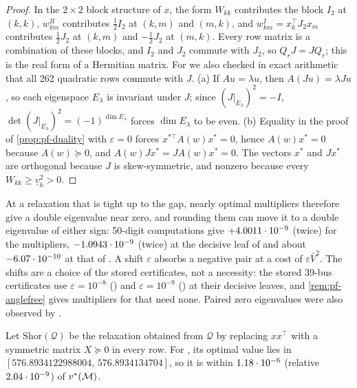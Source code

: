 \begin{proof}
In the $2\times2$ block structure of $x$, the form $W_{kk}$ contributes the block $I_2$ at $(k,k)$, $w^R_{km}$ contributes $\tfrac12I_2$ at $(k,m)$ and $(m,k)$, and $w^I_{km}=x_k^\top J_2x_m$ contributes $\tfrac12J_2$ at $(k,m)$ and $-\tfrac12J_2$ at $(m,k)$.
Every row matrix is a combination of these blocks, and $I_2$ and $J_2$ commute with $J_2$, so $Q_rJ=JQ_r$; this is the real form of a Hermitian matrix.
For  we also checked in exact arithmetic that all 262 quadratic rows commute with $J$.
(a) If $A u=\lambda u$, then $A(Ju)=\lambda Ju$, so each eigenspace $E_\lambda$ is invariant under $J$; since $(J|_{E_\lambda})^2=-I$, $\det(J|_{E_\lambda})^2=(-1)^{\dim E_\lambda}$ forces $\dim E_\lambda$ to be even.
(b) Equality in the proof of \cref{prop:pf-duality} with $\varepsilon=0$ forces $x^{*\top}A(w)x^*=0$, hence $A(w)x^*=0$ because $A(w)\succeq0$, and $A(w)Jx^*=JA(w)x^*=0$.
The vectors $x^*$ and $Jx^*$ are orthogonal because $J$ is skew-symmetric, and nonzero because every $W_{kk}\ge\underline v_k^2>0$.
\end{proof}

At a relaxation that is tight up to the gap, nearly optimal multipliers therefore give a double eigenvalue near zero, and rounding them can move it to a double eigenvalue of either sign:
50-digit computations give $+4.0011\cdot 10^{-9}$ (twice) for the  multipliers, $-1.0943\cdot 10^{-9}$ (twice) at the decisive leaf of  and about $-6.07\cdot 10^{-10}$ at that of .
A shift $\varepsilon$ absorbs a negative pair at a cost of $\varepsilon\bar V^2$.
The shifts are a choice of the stored certificates, not a necessity: the stored 39-bus certificates use $\varepsilon=10^{-8}$ () and $\varepsilon=10^{-9}$ () at their decisive leaves, and \cref{rem:pf-anglefree} gives multipliers for  that need none.
Paired zero eigenvalues were also observed by \citet{lavaei2012-zero-duality-gap-in-optimal}.

\begin{corollary}\label{cor:pf-shor}
Let $\mathrm{Shor}(\mathcal Q)$ be the relaxation obtained from $\mathcal Q$ by replacing $xx^\top$ with a symmetric matrix $X\succeq0$ in every row.
For , its optimal value lies in $[576.8934122988004,\,576.8934134704]$, so it is within $1.18\cdot 10^{-6}$ (relative $2.04\cdot 10^{-9}$) of $v^{*}(\mathcal{M})$.
\end{corollary}

